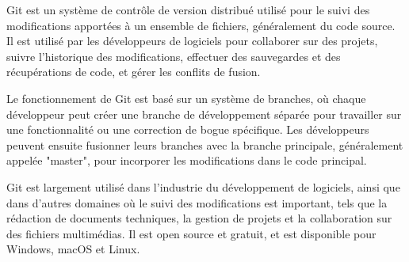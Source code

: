 Git est un système de contrôle de version distribué utilisé pour le suivi des modifications apportées à un ensemble de fichiers, généralement du code source. Il est utilisé par les développeurs de logiciels pour collaborer sur des projets, suivre l'historique des modifications, effectuer des sauvegardes et des récupérations de code, et gérer les conflits de fusion.

Le fonctionnement de Git est basé sur un système de branches, où chaque développeur peut créer une branche de développement séparée pour travailler sur une fonctionnalité ou une correction de bogue spécifique. Les développeurs peuvent ensuite fusionner leurs branches avec la branche principale, généralement appelée "master", pour incorporer les modifications dans le code principal.

Git est largement utilisé dans l'industrie du développement de logiciels, ainsi que dans d'autres domaines où le suivi des modifications est important, tels que la rédaction de documents techniques, la gestion de projets et la collaboration sur des fichiers multimédias. Il est open source et gratuit, et est disponible pour Windows, macOS et Linux.